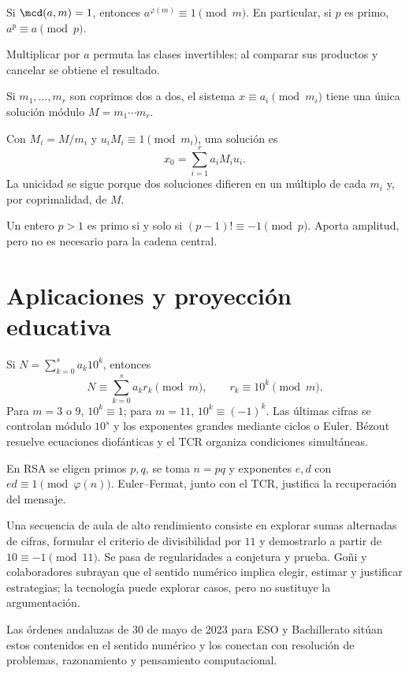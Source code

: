 \documentclass[10pt,a4paper]{article}
\begin{document}
\begin{teorema}
Si $\mcd(a,m)=1$, entonces $a^{\varphi(m)}\equiv1\pmod m$. En particular, si $p$ es primo, $a^p\equiv a\pmod p$.
\end{teorema}
Multiplicar por $a$ permuta las clases invertibles; al comparar sus productos y cancelar se obtiene el resultado.

\begin{teorema}
Si $m_1,\ldots,m_r$ son coprimos dos a dos, el sistema $x\equiv a_i\pmod{m_i}$ tiene una única solución módulo $M=m_1\cdots m_r$.
\end{teorema}
Con $M_i=M/m_i$ y $u_iM_i\equiv1\pmod{m_i}$, una solución es
\[
x_0=\sum_{i=1}^r a_iM_iu_i.
\]
La unicidad se sigue porque dos soluciones difieren en un múltiplo de cada $m_i$ y, por coprimalidad, de $M$.

\begin{ampliacion}[· Wilson]
Un entero $p>1$ es primo si y solo si $(p-1)!\equiv-1\pmod p$. Aporta amplitud, pero no es necesario para la cadena central.
\end{ampliacion}

\section{Aplicaciones y proyección educativa}
Si $N=\sum_{k=0}^{s}a_k10^k$, entonces
\[
N\equiv\sum_{k=0}^{s}a_k r_k\pmod m,\qquad r_k\equiv10^k\pmod m.
\]
Para $m=3$ o $9$, $10^k\equiv1$; para $m=11$, $10^k\equiv(-1)^k$. Las últimas cifras se controlan módulo $10^s$ y los exponentes grandes mediante ciclos o Euler. Bézout resuelve ecuaciones diofánticas y el TCR organiza condiciones simultáneas.

\begin{ampliacion}[· RSA]
En RSA se eligen primos $p,q$, se toma $n=pq$ y exponentes $e,d$ con $ed\equiv1\pmod{\varphi(n)}$. Euler--Fermat, junto con el TCR, justifica la recuperación del mensaje.
\end{ampliacion}

Una secuencia de aula de alto rendimiento consiste en explorar sumas alternadas de cifras, formular el criterio de divisibilidad por $11$ y demostrarlo a partir de $10\equiv-1\pmod{11}$. Se pasa de regularidades a conjetura y prueba. Goñi y colaboradores subrayan que el sentido numérico implica elegir, estimar y justificar estrategias; la tecnología puede explorar casos, pero no sustituye la argumentación.

Las órdenes andaluzas de 30 de mayo de 2023 para ESO y Bachillerato sitúan estos contenidos en el sentido numérico y los conectan con resolución de problemas, razonamiento y pensamiento computacional.
\end{document}
